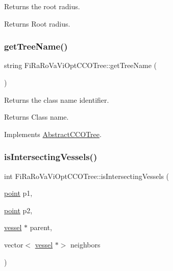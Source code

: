 Returns the root radius. \begin{DoxyReturn}{Returns}
Root radius. 
\end{DoxyReturn}
\mbox{\label{class_fi_ra_ro_va_vi_opt_c_c_o_tree_ab9e0556084e74d15d63900dd2f51059e}} 
\subsubsection{\texorpdfstring{get\+Tree\+Name()}{getTreeName()}}
{\footnotesize\ttfamily string Fi\+Ra\+Ro\+Va\+Vi\+Opt\+C\+C\+O\+Tree\+::get\+Tree\+Name (\begin{DoxyParamCaption}{ }\end{DoxyParamCaption})\hspace{0.3cm}{\ttfamily [virtual]}}

Returns the class name identifier. \begin{DoxyReturn}{Returns}
Class name. 
\end{DoxyReturn}


Implements \mbox{\hyperlink{class_abstract_c_c_o_tree_aa044337119c45985addba3ff7d554de2}{Abstract\+C\+C\+O\+Tree}}.

\mbox{\label{class_fi_ra_ro_va_vi_opt_c_c_o_tree_a3f93dc6bfc79cf34af64c5ad6fb40a0a}} 
\subsubsection{\texorpdfstring{is\+Intersecting\+Vessels()}{isIntersectingVessels()}}
{\footnotesize\ttfamily int Fi\+Ra\+Ro\+Va\+Vi\+Opt\+C\+C\+O\+Tree\+::is\+Intersecting\+Vessels (\begin{DoxyParamCaption}\item[{\mbox{\hyperlink{structpoint}{point}}}]{p1,  }\item[{\mbox{\hyperlink{structpoint}{point}}}]{p2,  }\item[{\mbox{\hyperlink{structvessel}{vessel}} $\ast$}]{parent,  }\item[{vector$<$ \mbox{\hyperlink{structvessel}{vessel}} $\ast$$>$}]{neighbors }\end{DoxyParamCaption})\hspace{0.3cm}{\ttfamily [private]}}

